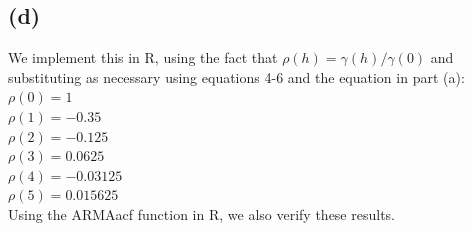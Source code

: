 \documentclass{article}
\begin{document}
{\subsection*{(d)}

We implement this in R, using the fact that $\rho(h) = \gamma(h) / \gamma(0)$ and substituting as necessary using equations 4-6 and the equation in part (a): \\
$\rho(0) = 1$ \\
$\rho(1) = -0.35$ \\
$\rho(2) = -0.125$ \\
$\rho(3) = 0.0625$ \\
$\rho(4) = -0.03125$ \\
$\rho(5) = 0.015625$ \\
Using the ARMAacf function in R, we also verify these results.
\newpage

}
\end{document}
